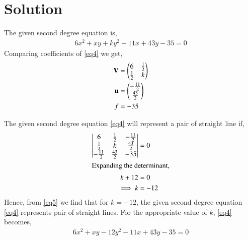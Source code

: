 \documentclass[journal,12pt,twocolumn]{IEEEtran}
\begin{document}
\section{Solution}

The given second degree equation is,
\begin{align}
6x^2 +xy+ky^2-11x+43y-35 = 0 \label{eq4}
\end{align}
Comparing coefficients of \eqref{eq4} we get,
\begin{align}
\mathbf{V} &= \begin{pmatrix}6&\frac{1}{2}\\\frac{1}{2}&k\end{pmatrix}\\
\mathbf{u} &= \begin{pmatrix}-\frac{11}{2}\\\frac{43}{2}\end{pmatrix}\\
f &= -35
\end{align}

The given second degree equation \eqref{eq4} will represent a pair of straight line if, 
\begin{align}
\begin{vmatrix}6&\frac{1}{2}&-\frac{11}{2}\\ \frac{1}{2}&k&\frac{43}{2}\\-\frac{11}{2}& \frac{43}{2}&-35\end{vmatrix}&=0\\
\intertext{Expanding the determinant,}
k+12&=0\\
\implies k&=-12\label{eq5}
\end{align}
Hence, from \eqref{eq5} we find that for $k=-12$, the given second degree equation \eqref{eq4} represents pair of straight lines. For the appropriate value of $k$, \eqref{eq4} becomes,
\begin{align}
6x^2 +xy-12y^2-11x+43y-35 = 0\label{eqmain}
\end{align}
\end{document}
